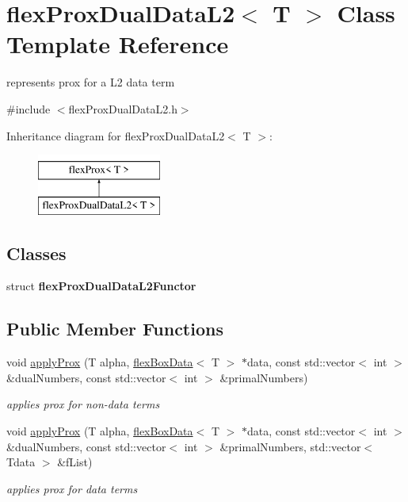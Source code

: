 \hypertarget{classflex_prox_dual_data_l2}{}\section{flex\+Prox\+Dual\+Data\+L2$<$ T $>$ Class Template Reference}
\label{classflex_prox_dual_data_l2}


represents prox for a L2 data term  




{\ttfamily \#include $<$flex\+Prox\+Dual\+Data\+L2.\+h$>$}

Inheritance diagram for flex\+Prox\+Dual\+Data\+L2$<$ T $>$\+:\begin{figure}[H]
\begin{center}
\leavevmode
\includegraphics[height=2.000000cm]{classflex_prox_dual_data_l2}
\end{center}
\end{figure}
\subsection*{Classes}
\begin{DoxyCompactItemize}
\item 
struct {\bfseries flex\+Prox\+Dual\+Data\+L2\+Functor}
\end{DoxyCompactItemize}
\subsection*{Public Member Functions}
\begin{DoxyCompactItemize}
\item 
void \hyperlink{classflex_prox_dual_data_l2_ae3ee176dc6c05e8fba0df96c73b10464}{apply\+Prox} (T alpha, \hyperlink{classflex_box_data}{flex\+Box\+Data}$<$ T $>$ $\ast$data, const std\+::vector$<$ int $>$ \&dual\+Numbers, const std\+::vector$<$ int $>$ \&primal\+Numbers)
\begin{DoxyCompactList}\small\item\em applies prox for non-\/data terms \end{DoxyCompactList}\item 
void \hyperlink{classflex_prox_dual_data_l2_a0d7a54201b01863a9a76f6fc2d52cf22}{apply\+Prox} (T alpha, \hyperlink{classflex_box_data}{flex\+Box\+Data}$<$ T $>$ $\ast$data, const std\+::vector$<$ int $>$ \&dual\+Numbers, const std\+::vector$<$ int $>$ \&primal\+Numbers, std\+::vector$<$ Tdata $>$ \&f\+List)
\begin{DoxyCompactList}\small\item\em applies prox for data terms \end{DoxyCompactList}\end{DoxyCompactItemize}

